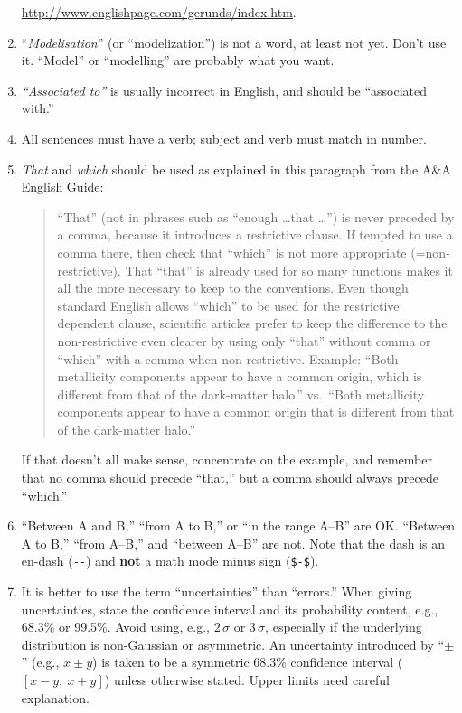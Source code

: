 \documentclass[letterpaper,11pt]{article}
\begin{document}
\begin{enumerate}
\url{http://www.englishpage.com/gerunds/index.htm}.

\item ``{\it Modelisation\/}'' (or ``modelization'') is not a word, at least not yet.  Don't use it.  ``Model'' or ``modelling'' are probably
what you want.

\item

{\it ``Associated to''\/} is usually incorrect in English, and should be
``associated with.''


\item All sentences must have a verb; subject and verb must match in number.

\item {\it That\/} and {\it which\/} should be used as explained in this paragraph from the A\&A English Guide:

\begin{quotation}
\noindent ``That'' (not in phrases such as ``enough \dots that \dots'') is never
preceded by a comma, because it introduces a restrictive clause.  If tempted
to use a comma there, then check that ``which'' is not more appropriate
(=non-restrictive).  That ``that'' is already used for so many functions makes
it all the more necessary to keep to the conventions.  Even though standard
English allows ``which'' to be used for the restrictive dependent clause,
scientific articles prefer to keep the difference to the non-restrictive even
clearer by using only ``that'' without comma or ``which'' with a comma when
non-restrictive.  Example: ``Both metallicity components appear to have a
common origin, which is different from that of the dark-matter halo.'' vs.\
``Both metallicity components appear to have a common origin that is different
from that of the dark-matter halo.''
\end{quotation}

If that doesn't all make sense, concentrate on the example, and remember that
no comma should precede ``that,'' but a comma should always precede ``which.''

\item ``Between A and B,'' ``from A to B,'' or ``in the range A--B'' are
\hbox{OK}.  ``Between A to B,'' ``from A--B,'' and ``between A--B'' are not.  Note that the dash is an en-dash (\verb|--|) and {\bf not} a math mode minus sign (\verb|$-$|).

\item It is better to use the term ``uncertainties'' than ``errors.''  When
giving uncertainties, state the confidence interval and its probability
content, e.g., 68.3\% or 99.5\%.  Avoid using, e.g., $2\,\sigma$ or $3\,\sigma$,
especially if the underlying distribution is non-Gaussian or asymmetric.  An
uncertainty introduced by ``$\pm$'' (e.g., $x\pm y$) is taken to be a
symmetric 68.3\% confidence interval ($[x-y,\ x+y]$) unless otherwise stated.
Upper limits need careful explanation. 


\end{enumerate}
\end{document}
